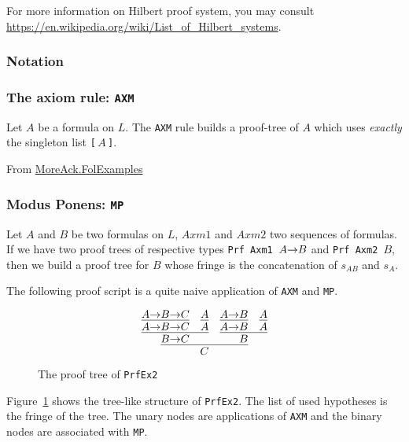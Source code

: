 For more information on Hilbert proof system, you may consult
\url{https://en.wikipedia.org/wiki/List_of_Hilbert_systems}.


\subsubsection{Notation}


  
\subsubsection{The axiom rule: \texttt{AXM}}

Let $A$ be a formula on $L$.  The \texttt{AXM} rule builds a proof-tree
of $A$ which uses \emph{exactly} the singleton list \texttt{[$\,A\,$]}.



\noindent From \href{../theories/html/hydras.MoreAck.FolExamples.html}{MoreAck.FolExamples}


\subsubsection{Modus Ponens: \texttt{MP}}

Let $A$ and $B$ be two formulas on $L$, $\textit{Axm1}$
 and $\textit{Axm2}$ two sequences of formulas.
If we have 
two proof trees of respective types \texttt{Prf Axm1 $A\mbox{$\rightarrow$} B$} and  \texttt{Prf Axm2 $B$}, then we build a proof tree
for $B$ whose fringe is the concatenation of $s_{AB}$ and $s_A$.



The following proof script is a quite naive application of 
\texttt{AXM} and \texttt{MP}.

\label{proof:PrfEx2}

\begin{figure}[h]
  \centering
  \[
  \infer{C}{ 
    \infer{B \arrow C}
    {\infer{ A \arrow B \arrow C}
      { A \arrow B \arrow C}
      &
      \infer{A}{A}}
    & \infer{B}{
      \infer{A\arrow B}{A\arrow B} &
      \infer{A}{A}}
                     }
\]
  \caption{The proof tree of \texttt{PrfEx2}}
  \label{fig:PrfEx2}
\end{figure}

Figure~\ref{fig:PrfEx2} shows the tree-like structure of 
\texttt{PrfEx2}. The list of used hypotheses is the fringe of the tree. The unary nodes are applications of \texttt{AXM} and the binary nodes are associated with \texttt{MP}.


